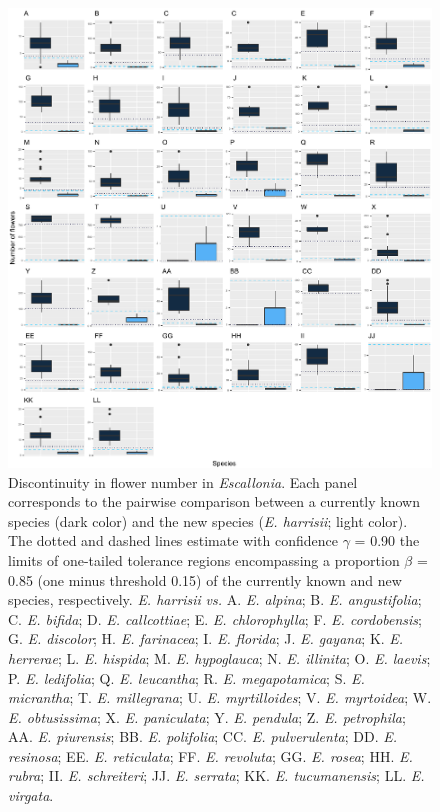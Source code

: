 \documentclass[fleqn,10pt,lineno]{wlpeerj} %
\begin{document}
\begin{figure}[ht]
\centering
\includegraphics[width=\linewidth]{Figure4}
\caption{Discontinuity in flower number in \emph{Escallonia}. Each panel corresponds to the pairwise comparison between a currently known species (dark color) and the new species (\emph{E. harrisii}; light color). The dotted and dashed lines estimate with confidence $\gamma$ = 0.90 the limits of one-tailed tolerance regions encompassing a proportion $\beta$ = 0.85 (one minus threshold 0.15) of the currently known and new species, respectively. \emph{E. harrisii} \emph{vs.} A. \emph{E. alpina}; B. \emph{E. angustifolia}; C. \emph{E. bifida}; D. \emph{E. callcottiae}; E. \emph{E. chlorophylla}; F. \emph{E. cordobensis}; G. \emph{E. discolor}; H. \emph{E. farinacea}; I. \emph{E. florida}; J. \emph{E. gayana}; K. \emph{E. herrerae}; L. \emph{E. hispida}; M. \emph{E. hypoglauca}; N. \emph{E. illinita}; O. \emph{E. laevis}; P. \emph{E. ledifolia}; Q. \emph{E. leucantha}; R. \emph{E. megapotamica}; S. \emph{E. micrantha}; T. \emph{E. millegrana}; U. \emph{E. myrtilloides}; V. \emph{E. myrtoidea}; W. \emph{E. obtusissima}; X. \emph{E. paniculata}; Y. \emph{E. pendula}; Z. \emph{E. petrophila}; AA. \emph{E. piurensis}; BB. \emph{E. polifolia}; CC. \emph{E. pulverulenta}; DD. \emph{E. resinosa}; EE. \emph{E. reticulata}; FF. \emph{E. revoluta}; GG. \emph{E. rosea}; HH. \emph{E. rubra}; II. \emph{E. schreiteri}; JJ. \emph{E. serrata};  KK. \emph{E. tucumanensis}; LL. \emph{E. virgata}.}
\label{fig:Figure4}
\end{figure}
\end{document}
